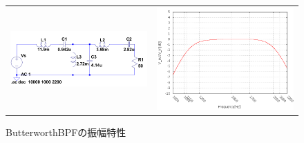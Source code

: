 \documentclass[10pt,a4j,dvipdfmx]{jsarticle}
\begin{document}
 \begin{figure}[H]
     \begin{tabular}{cc}
       \begin{minipage}[t]{0.45\hsize}
         \centering
         \includegraphics[width=8cm]{ButBPF.png}
         \caption{ButterworthBPF($f_0 = 1500$)}
       \end{minipage} &
       \begin{minipage}[t]{0.45\hsize}
         \centering
         \includegraphics[width = 8cm]{BBPF_Vgraf.png}
         \caption{ButterworthBPFの振幅特性}
       \end{minipage}
     \end{tabular}
   \end{figure}
\end{document}
